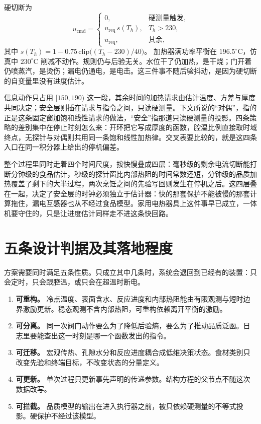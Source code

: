 硬切断为
\begin{equation}
\label{eq:hard}
u_{\mathrm{cmd}}=
\begin{cases}
0, & \text{硬测量触发},\\
u_{\mathrm{req}}\,s(T_h), & T_h>230,\\
u_{\mathrm{req}}, & \text{其余},
\end{cases}
\end{equation}
其中 \(s(T_h)=1-0.75\,\mathrm{clip}\bigl((T_h-230)/40\bigr)\)。
加热器满功率平衡在 \(196.5^\circ\mathrm{C}\)，仿真中 \(230^\circ\mathrm{C}\) 削减不动作。规则仍与后验无关。水位干了仍加热，是干烧；门开着仍喷蒸汽，是烫伤；漏电仍通电，是电击。这三件事不随后验抖动，是因为硬切断的自变量里没有进度估计。

信息动作只占用 \([150,190)\) 这一段，其余时间的加热请求由估计温度、方差与厚度共同决定；安全层则插在请求与指令之间，只读硬测量。下文所说的“对偶”，指的正是这条固定窗加饱和线性请求的做法，“安全”指那道只读硬测量的投影。四条策略的差别集中在停止时刻怎么来：开环把它写成厚度的函数，腔温比例直接取时域终点，无探针与对偶则共用同一条饱和线性加热律。交叉表要比较的，就是这四条入口在同一积分器上给出的停机偏差。

整个过程里同时走着四个时间尺度，按快慢叠成四层：毫秒级的剩余电流切断能打断分钟级的食品估计，秒级的探针窗比内部热阻的时间常数还短，分钟级的品质加热覆盖了剩下的大半过程，两次烹饪之间的先验写回则发生在停机之后。这四层叠在一起，决定了安全层的时钟必须独立于估计器：快的那套保护不能被慢的那套计算拖住，漏电互感器也从不经过食品模型。家用电热器具上这件事早已成立，一体机要守住的，只是让进度估计同样走不进这条快回路。

\section{五条设计判据及其落地程度}

方案需要同时满足五条性质。只成立其中几条时，系统会退回到已经有的装置：只会定时，只会跟腔温，或只会在超温时断电。

\begin{enumerate}
\item \textbf{可重构。} 冷点温度、表面含水、反应进度和内部热阻能由有限观测与短时边界激励更新。稳态观测不含内部热阻，可重构依赖离开平衡的激励。
\item \textbf{可分离。} 同一次阀门动作要么为了降低后验熵，要么为了推动品质泛函。日志里要能查出这一时刻是哪一个函数发出的指令。
\item \textbf{可迁移。} 宏观传热、孔隙水分和反应进度耦合成低维决策状态。食材类别只改变先验和终端目标，不改变状态的分量定义。
\item \textbf{可更新。} 单次过程只更新事先声明的传递参数。结构方程的父节点不随这次数据改写。
\item \textbf{可拦截。} 品质模型的输出在进入执行器之前，被只依赖硬测量的不等式投影。硬保护不经过该模型。
\end{enumerate}

